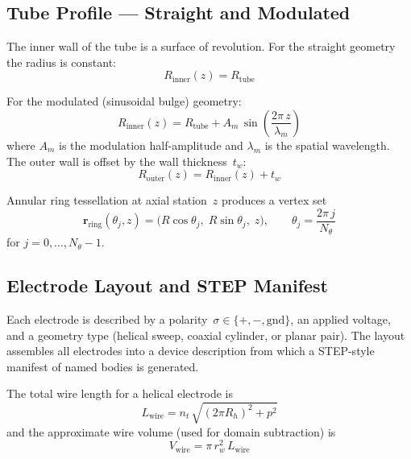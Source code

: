 \documentclass[11pt,a4paper]{article}
\begin{document}
\subsection{Tube Profile — Straight and Modulated}

The inner wall of the tube is a surface of revolution.  For the straight
geometry the radius is constant:
\begin{equation}\label{eq:tube_straight}
  R_{\mathrm{inner}}(z) = R_{\mathrm{tube}}
\end{equation}

For the modulated (sinusoidal bulge) geometry:
\begin{equation}\label{eq:tube_mod}
  R_{\mathrm{inner}}(z)
  = R_{\mathrm{tube}}
    + A_m\,\sin\!\left(\frac{2\pi\,z}{\lambda_m}\right)
\end{equation}
where $A_m$ is the modulation half-amplitude and $\lambda_m$ is the spatial
wavelength.  The outer wall is offset by the wall thickness~$t_w$:
\begin{equation}\label{eq:tube_outer}
  R_{\mathrm{outer}}(z) = R_{\mathrm{inner}}(z) + t_w
\end{equation}

Annular ring tessellation at axial station~$z$ produces a vertex set
\begin{equation}\label{eq:ring}
  \bm{r}_{\mathrm{ring}}(\theta_j, z) =
    \bigl(R\cos\theta_j,\; R\sin\theta_j,\; z\bigr),
  \qquad \theta_j = \frac{2\pi\,j}{N_\theta}
\end{equation}
for $j = 0, \ldots, N_\theta - 1$.

\subsection{Electrode Layout and STEP Manifest}

Each electrode is described by a polarity~$\sigma\in\{+, -, \mathrm{gnd}\}$,
an applied voltage, and a geometry type (helical sweep, coaxial cylinder, or
planar pair).  The layout assembles all electrodes into a device description
from which a STEP-style manifest of named bodies is generated.

The total wire length for a helical electrode is
\begin{equation}\label{eq:wire_length}
  L_{\mathrm{wire}} = n_t\,\sqrt{(2\pi R_h)^2 + p^2}
\end{equation}
and the approximate wire volume (used for domain subtraction) is
\begin{equation}\label{eq:wire_volume}
  V_{\mathrm{wire}} = \pi\,r_w^2\,L_{\mathrm{wire}}
\end{equation}
\end{document}
